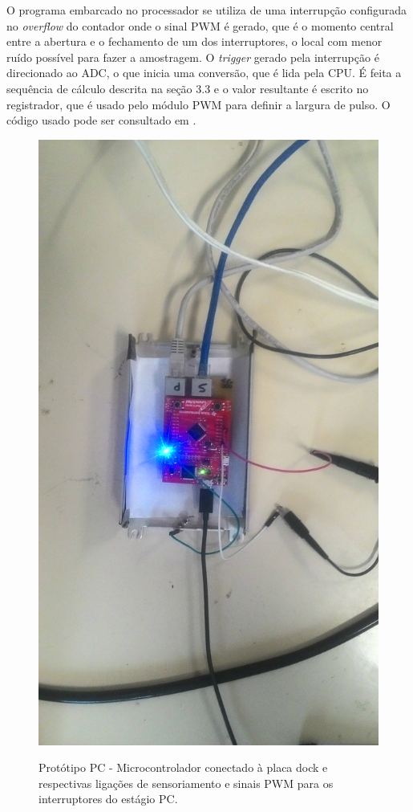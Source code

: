 \documentclass[
        12pt,
        openany, %
        oneside, %
        a4paper,			
        english,			
        brazil
        ]{abntbibufjf}
\begin{document}
O programa embarcado no processador se utiliza de uma interrupção configurada no \textit{overflow} do contador onde o sinal PWM é gerado, que é o momento central entre a abertura e o fechamento de um dos interruptores, o local com menor ruído possível para fazer a amostragem. O \textit{trigger} gerado pela interrupção é direcionado ao ADC, o que inicia uma conversão, que é lida pela CPU. É feita a sequência de cálculo descrita na seção 3.3 e o valor resultante é escrito no registrador, que é usado pelo módulo PWM para definir a largura de pulso. O código usado pode ser consultado em \cite{github}. 

\begin{figure}[!h]
	\centering
	\caption{Protótipo PC - Microcontrolador conectado à placa dock e respectivas ligações de sensoriamento e sinais PWM para os interruptores do estágio PC.}
	\includegraphics[scale=.1]{../FOTOGRAFIAS/P_20180712_152414.jpg}\\
	\label{pc-ctrl-board}
\end{figure}
\end{document}
